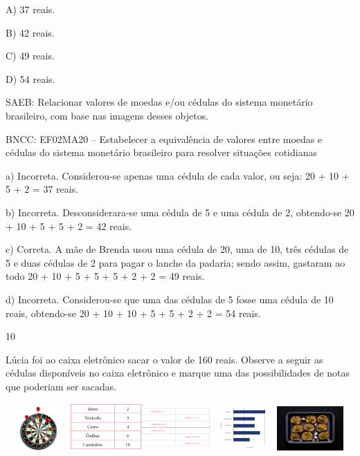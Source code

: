 \begin{escolha}
\begin{escolha}
{{{{A) 37 reais.

B) 42 reais.

C) 49 reais.

D) 54 reais.

SAEB: Relacionar valores de moedas e/ou cédulas do sistema
monetário brasileiro, com base nas imagens desses objetos.

BNCC: EF02MA20 -- Estabelecer a equivalência de valores entre moedas e
cédulas do sistema monetário brasileiro para resolver situações
cotidianas

a) Incorreta. Considerou-se apenas uma cédula de cada valor, ou seja: 20 +
10 + 5 + 2 = 37 reais.

b) Incorreta. Desconsiderara-se uma cédula de 5 e uma cédula de 2, obtendo-se
20 + 10 + 5 + 5 + 2 = 42 reais.

c) Correta. A mãe de Brenda usou uma cédula de 20, uma de 10, três
cédulas de 5 e duas cédulas de 2 para pagar o lanche da padaria; sendo
assim, gastaram ao todo 20 + 10 + 5 + 5 + 5 + 2 + 2 = 49 reais.

d) Incorreta. Considerou-se que uma das cédulas de 5 fosse uma cédula de 10
reais, obtendo-se 20 + 10 + 10 + 5 + 5 + 2 + 2 = 54 reais.

\num{10}

Lúcia foi ao caixa eletrônico sacar o valor de 160 reais. Observe a seguir
as cédulas disponíveis no caixa eletrônico e marque uma das
possibilidades de notas que poderiam ser sacadas.

\includegraphics[width=0.98131in,height=0.65625in]{media/image108.png}\includegraphics[width=1.06299in,height=0.71087in]{media/image157.png}\includegraphics[width=1.02736in,height=0.68704in]{media/image110.png}\includegraphics[width=1.01480in,height=0.67865in]{media/image158.png}\includegraphics[width=0.99484in,height=0.66530in]{media/image159.png}

}}}}
\end{escolha}
\end{escolha}
